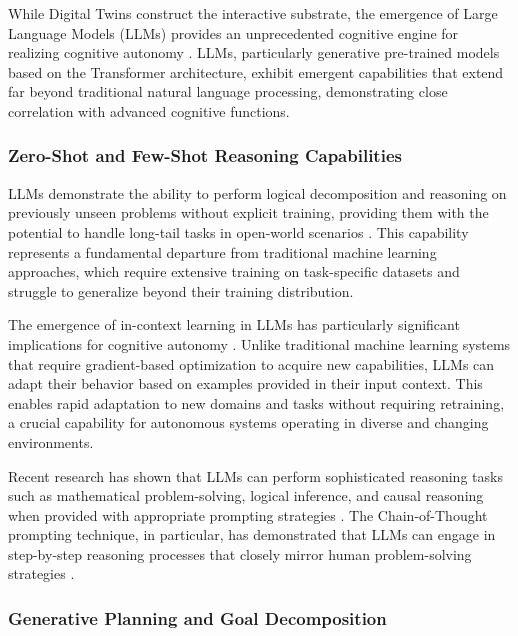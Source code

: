 While Digital Twins construct the interactive substrate, the emergence of Large Language Models (LLMs) provides an unprecedented cognitive engine for realizing cognitive autonomy \cite{brown2020language, chowdhery2022palm, openai2023gpt4}. LLMs, particularly generative pre-trained models based on the Transformer architecture, exhibit emergent capabilities that extend far beyond traditional natural language processing, demonstrating close correlation with advanced cognitive functions.

\subsubsection{Zero-Shot and Few-Shot Reasoning Capabilities}

LLMs demonstrate the ability to perform logical decomposition and reasoning on previously unseen problems without explicit training, providing them with the potential to handle long-tail tasks in open-world scenarios \cite{brown2020language, wei2022emergent}. This capability represents a fundamental departure from traditional machine learning approaches, which require extensive training on task-specific datasets and struggle to generalize beyond their training distribution.

The emergence of in-context learning in LLMs has particularly significant implications for cognitive autonomy \cite{dong2022survey, liu2023pre}. Unlike traditional machine learning systems that require gradient-based optimization to acquire new capabilities, LLMs can adapt their behavior based on examples provided in their input context. This enables rapid adaptation to new domains and tasks without requiring retraining, a crucial capability for autonomous systems operating in diverse and changing environments.

Recent research has shown that LLMs can perform sophisticated reasoning tasks such as mathematical problem-solving, logical inference, and causal reasoning when provided with appropriate prompting strategies \cite{wei2022chain, kojima2022large, wang2022self}. The Chain-of-Thought prompting technique, in particular, has demonstrated that LLMs can engage in step-by-step reasoning processes that closely mirror human problem-solving strategies \cite{wei2022chain, zhang2022automatic}.

\subsubsection{Generative Planning and Goal Decomposition}


